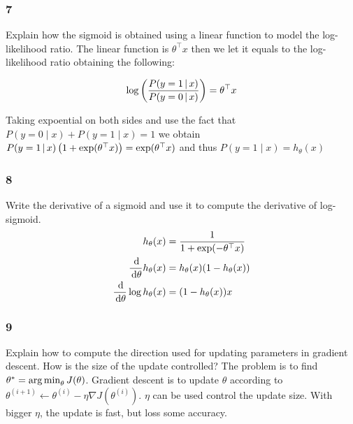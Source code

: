 \documentclass{article}
\begin{document}
\subsubsection*{7}
\begin{myleftlinebox}
    Explain how the sigmoid is obtained using a linear function to model the log-likelihood ratio.
    \tcblower
    The linear function is \(\theta^\top x\) then we let it equals to the log-likelihood ratio obtaining the following:

    \[\log\left( \frac{P(y=1\,|\, x)}{P(y=0\,|\, x)} \right)=\theta^\top x\]

    Taking expoential on both sides and use the fact that \(P(y=0\mid x) + P(y=1\mid x)=1\) we obtain \(P(y=1\,|\, x) \left( 1+\exp(\theta^\top x) \right)=\exp(\theta^\top x)\) and thus \(P(y=1\mid x)=h_\theta(x)\)
\end{myleftlinebox}

\subsubsection*{8}
\begin{myleftlinebox}
    Write the derivative of a sigmoid and use it to compute the derivative of log-sigmoid.
    \tcblower
    \begin{equation*}
        \begin{split}
            h_\theta(x) &= \frac{1}{1+\exp(-\theta^\top x)}\\
            \frac{\,\mathrm{d}}{\,\mathrm{d}\theta} h_\theta(x) &= h_\theta(x)(1-h_\theta(x))\\
            \frac{\,\mathrm{d}}{\,\mathrm{d}\theta} \log h_\theta(x) &= (1-h_\theta(x))x
        \end{split}
    \end{equation*}
\end{myleftlinebox}

\subsubsection*{9}
\begin{myleftlinebox}
    Explain how to compute the direction used for updating parameters in gradient descent. How is the size of the update controlled?
    \tcblower
    The problem is to find \(\theta^*=\operatorname*{arg\,min}_\theta J(\theta)\). Gradient descent is to update \(\theta\) according to \(\theta^{(i+1)}\gets \theta^{(i)}-\eta \nabla J(\theta^{(i)})\). \(\eta\) can be used control the update size. With bigger \(\eta\), the update is fast, but loss some accuracy.
\end{myleftlinebox}
\end{document}
